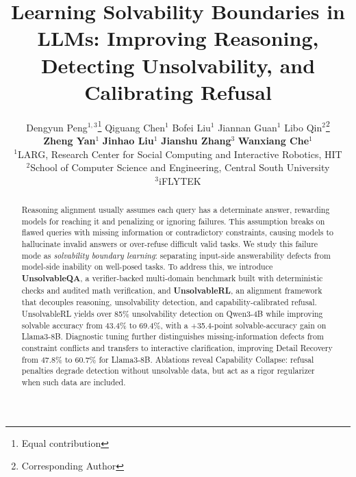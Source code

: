 \documentclass[11pt]{article}
\title{Learning Solvability Boundaries in LLMs: Improving Reasoning, Detecting Unsolvability, and Calibrating Refusal}
\author{
 Dengyun Peng$^{1,3}$\thanks{Equal contribution} \quad
 Qiguang Chen$^{1}$\footnotemark[1] \quad
 Bofei Liu$^{1}$ \quad
 Jiannan Guan$^{1}$ \quad
 Libo Qin$^{2}$\thanks{Corresponding Author} \\
 \textbf{Zheng Yan}$^{1}$ \quad
\textbf{Jinhao Liu}$^{1}$ \quad
\textbf{Jianshu Zhang}$^{3}$ \quad
 \textbf{Wanxiang Che$^{1}$}\footnotemark[2] \\[2mm]
 $^{1}$LARG, Research Center for Social Computing and Interactive Robotics, HIT \\
 $^{2}$School of Computer Science and Engineering, Central South University \\
 $^{3}$iFLYTEK
}
\begin{document}
\maketitle
\thispagestyle{fancy}
\pagestyle{fancy}
\begin{abstract}
Reasoning alignment usually assumes each query has a determinate answer, rewarding models for reaching it and penalizing or ignoring failures. This assumption breaks on flawed queries with missing information or contradictory constraints, causing models to hallucinate invalid answers or over-refuse difficult valid tasks. We study this failure mode as \textit{solvability boundary learning}: separating input-side answerability defects from model-side inability on well-posed tasks. To address this, we introduce \textbf{UnsolvableQA}, a verifier-backed multi-domain benchmark built with deterministic checks and audited math verification, and \textbf{UnsolvableRL}, an alignment framework that decouples reasoning, unsolvability detection, and capability-calibrated refusal. UnsolvableRL yields over 85\% unsolvability detection on Qwen3-4B while improving solvable accuracy from 43.4\% to 69.4\%, with a +35.4-point solvable-accuracy gain on Llama3-8B. Diagnostic tuning further distinguishes missing-information defects from constraint conflicts and transfers to interactive clarification, improving Detail Recovery from 47.8\% to 60.7\% for Llama3-8B. Ablations reveal Capability Collapse: refusal penalties degrade detection without unsolvable data, but act as a rigor regularizer when such data are included.
\end{abstract}











\appendix


\label{sec:appendix}
\end{document}
